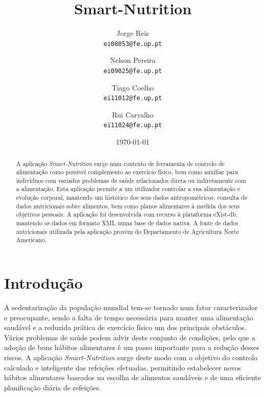 \documentclass[twocolumn,twoside,11pt,a4paper]{article}
\title{\vspace{-15mm}\fontsize{24pt}{10pt}\selectfont\textbf{Smart-Nutrition}} %
\author{Jorge Reis\\
\small \texttt{ei08053@fe.up.pt}\\
\and
Nelson Pereira\\
\small \texttt{ei09025@fe.up.pt}
\and
Tiago Coelho\\
\small \texttt{ei11012@fe.up.pt}\\
\and
Rui Carvalho\\
\small \texttt{ei11024@fe.up.pt}\\
\vspace{-5mm}
}
\date{\today}
\begin{document}
\maketitle
\thispagestyle{plain}            %


\begin{abstract}
A aplicação \textit{Smart-Nutrition} surge num contexto de ferramenta de controlo de alimentação como possível complemento ao exercício físico, bem como auxiliar para indivíduos com variados problemas de saúde relacionados direta ou indiretamente com a alimentação. Esta aplicação permite a um utilizador controlar a sua alimentação e evolução corporal, mantendo um histórico dos seus dados antropométricos, consulta de dados nutricionais sobre alimentos, bem como planos alimentares à medida dos seus objetivos pessoais. A aplicação foi desenvolvida com recurso à plataforma eXist-db, mantendo os dados em formato XML numa base de dados nativa. A fonte de dados nutricionais utilizada pela aplicação provém do Departamento de Agricultura Norte Americano.
\end{abstract}


\section{Introdução}\label{sec:intro}

A sedentarização da população mundial tem-se tornado num fator caracterizador e preocupante, sendo a falta de tempo necessária para manter uma alimentação saudável e a reduzida prática de exercício físico um dos principais obstáculos.
Vários problemas de saúde podem advir deste conjunto de condições, pelo que a adoção de bons hábitos alimentares é um passo importante para a redução desses riscos.
A aplicação \textit{Smart-Nutrition} surge deste modo com o objetivo do controlo calculado e inteligente das refeições efetuadas, permitindo estabelecer novos hábitos alimentares baseados na escolha de alimentos saudáveis e de uma eficiente planificação diária de refeições.
\end{document}
